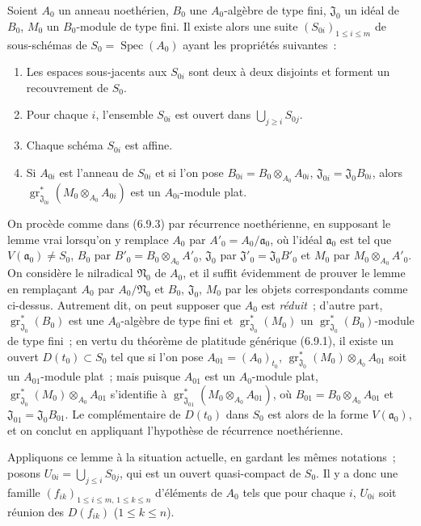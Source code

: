 \begin{lemma}[11.2.9.5]
\label{IV.11.2.9.5-fr}
Soient $A_0$ un anneau noethérien, $B_0$ une $A_0$-algèbre de type fini,
$\mathfrak J_0$ un idéal de $B_0$, $M_0$ un $B_0$-module de type fini. Il
existe alors une suite $(S_{0i})_{1\leq i\leq m}$ de sous-schémas de
$S_0=\operatorname{Spec}(A_0)$ ayant les propriétés suivantes~:
\begin{enumerate}[label=\arabic{enumi}$^\circ$]
\item Les espaces sous-jacents aux $S_{0i}$ sont deux à deux disjoints et
forment un recouvrement de $S_0$.
\item Pour chaque $i$, l'ensemble $S_{0i}$ est ouvert dans
$\bigcup_{j\geq i}S_{0j}$.
\item Chaque schéma $S_{0i}$ est affine.
\item Si $A_{0i}$ est l'anneau de $S_{0i}$ et si l'on pose
$B_{0i}=B_0\otimes_{A_0}A_{0i}$, $\mathfrak J_{0i}=\mathfrak J_0B_{0i}$,
alors
$\operatorname{gr}_{\mathfrak J_{0i}}^*(M_0\otimes_{A_0}A_{0i})$ est un
$A_{0i}$-module plat.
\end{enumerate}
\end{lemma}

On procède comme dans (6.9.3) par récurrence noethérienne, en supposant le
lemme vrai lorsqu'on y remplace $A_0$ par $A'_0=A_0/\mathfrak a_0$, où
l'idéal $\mathfrak a_0$ est tel que $V(\mathfrak a_0)\neq S_0$, $B_0$ par
$B'_0=B_0\otimes_{A_0}A'_0$, $\mathfrak J_0$ par
$\mathfrak J'_0=\mathfrak J_0B'_0$ et $M_0$ par $M_0\otimes_{A_0}A'_0$. On
considère le nilradical $\mathfrak N_0$ de $A_0$, et il suffit évidemment de
prouver le lemme en remplaçant $A_0$ par $A_0/\mathfrak N_0$ et $B_0$,
$\mathfrak J_0$, $M_0$ par les objets correspondants comme ci-dessus.
Autrement dit, on peut supposer que $A_0$ est \emph{réduit}~; d'autre part,
$\operatorname{gr}_{\mathfrak J_0}^*(B_0)$ est une $A_0$-algèbre de type fini
et $\operatorname{gr}_{\mathfrak J_0}^*(M_0)$ un
$\operatorname{gr}_{\mathfrak J_0}^*(B_0)$-module de type fini~; en vertu du
théorème de platitude générique (6.9.1), il existe un ouvert
$D(t_0)\subset S_0$ tel que si l'on pose $A_{01}=(A_0)_{t_0}$,
$\operatorname{gr}_{\mathfrak J_0}^*(M_0)\otimes_{A_0}A_{01}$ soit un
$A_{01}$-module plat~; mais puisque $A_{01}$ est un $A_0$-module plat,
$\operatorname{gr}_{\mathfrak J_0}^*(M_0)\otimes_{A_0}A_{01}$ s'identifie à
$\operatorname{gr}_{\mathfrak J_{01}}^*(M_0\otimes_{A_0}A_{01})$, où
$B_{01}=B_0\otimes_{A_0}A_{01}$ et $\mathfrak J_{01}=\mathfrak J_0B_{01}$.
Le complémentaire de $D(t_0)$ dans $S_0$ est alors de la forme
$V(\mathfrak a_0)$, et on conclut en appliquant l'hypothèse de récurrence
noethérienne.

Appliquons ce lemme à la situation actuelle, en gardant les mêmes notations~;
posons $U_{0i}=\bigcup_{j\leq i}S_{0j}$, qui est un ouvert quasi-compact de
$S_0$. Il y a donc une famille
$(f_{ik})_{1\leq i\leq m,\,1\leq k\leq n}$ d'éléments de $A_0$ tels que pour
chaque $i$, $U_{0i}$ soit réunion des $D(f_{ik})$ ($1\leq k\leq n$).

